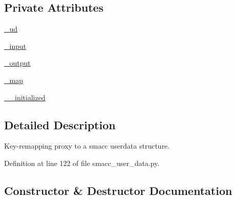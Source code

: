 \subsection*{Private Attributes}
\begin{DoxyCompactItemize}
\item 
\hyperlink{classsmacc__viewer_1_1smacc__user__data_1_1Remapper_a4ad9be52ca6ca7ebf730bac5b0e14c9a}{\+\_\+ud}
\item 
\hyperlink{classsmacc__viewer_1_1smacc__user__data_1_1Remapper_a566aa51939bf0ea5fab1d3928087a51c}{\+\_\+input}
\item 
\hyperlink{classsmacc__viewer_1_1smacc__user__data_1_1Remapper_aafa61285cd9e59e1a326c346aea0a81f}{\+\_\+output}
\item 
\hyperlink{classsmacc__viewer_1_1smacc__user__data_1_1Remapper_a25f3632c15ad2e88ee178cd5e1797cf8}{\+\_\+map}
\item 
\hyperlink{classsmacc__viewer_1_1smacc__user__data_1_1Remapper_aa59ac4f6560bf22ba9e411d408184909}{\+\_\+\+\_\+initialized}
\end{DoxyCompactItemize}


\subsection{Detailed Description}
\begin{DoxyVerb}Key-remapping proxy to a smacc userdata structure.\end{DoxyVerb}
 

Definition at line 122 of file smacc\+\_\+user\+\_\+data.\+py.



\subsection{Constructor \& Destructor Documentation}
